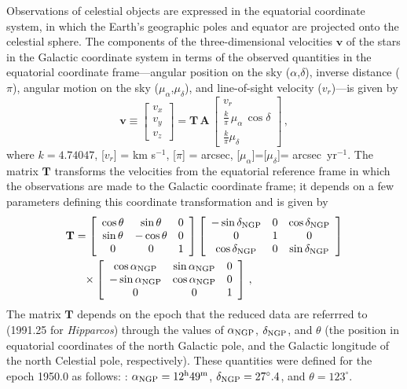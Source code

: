 \documentclass[aoas,preprint,authoryear,round]{imsart}
\newcommand{\Hipparcos}{\emph{Hipparcos}}
\renewcommand{\vec}[1]{\mathbf{#1}} %
\newcommand{\vv}{\vec{v}}
\newcommand{\ten}[1]{\mathbf{#1}} %
\newcommand{\TT}{\ten{T}}
\newcommand{\matrixleft}{\left[}
\newcommand{\matrixright}{\right]}
\newcommand{\parallax}{\ensuremath{\pi}}
\newcommand{\vrr}{\ensuremath{v_r}}
\newcommand{\ra}{\ensuremath{\alpha}}
\newcommand{\dec}{\ensuremath{\delta}}
\newcommand{\pmra}{\ensuremath{\mu_{\ra}}}
\newcommand{\pmdec}{\ensuremath{\mu_{\dec}}}
\newcommand{\vx}{\ensuremath{v_x}}
\newcommand{\vy}{\ensuremath{v_y}}
\newcommand{\vz}{\ensuremath{v_z}}
\newcommand{\AAA}{\ten{A}}
\newcommand{\arcsecs}{\textnormal{arcsec}}
\newcommand{\ngp}{\textnormal{NGP}}
\newcommand{\rangp}{\ensuremath{\ra_\ngp}}
\newcommand{\decngp}{\ensuremath{\dec_\ngp}}
\newcommand{\degree}{^{\circ}}
\begin{document}
Observations of celestial objects are expressed in the equatorial
coordinate system, in which the Earth's geographic poles and equator
are projected onto the celestial sphere. The components of the
three-dimensional velocities $\vv$ of the stars in the Galactic
coordinate system in terms of the observed quantities in the
equatorial coordinate frame---angular position on the sky (\ra,\dec),
inverse distance (\parallax), angular motion on the sky
(\pmra,\pmdec), and line-of-sight velocity (\vrr)---is given by
\begin{equation}\label{eq:vrpmrapmdectoUVW2}
\vv \equiv \matrixleft \begin{array}{c} \vx \\ \vy \\ \vz \end{array} \matrixright =
\TT \, \AAA \, \matrixleft \begin{array}{c} \vrr  \\ \frac{k}{\parallax}\,\pmra\,\cos\dec\\\frac{k}{\parallax}\pmdec\end{array} \matrixright\, ,
\end{equation}
where $k = 4.74047$, [\vrr] = km s$^{-1}$,
[\parallax] = \arcsecs, [\pmra]=[\pmdec]= \arcsecs\ yr$^{-1}$. The
matrix $\TT$ transforms the velocities from the equatorial reference
frame in which the observations are made to the Galactic coordinate
frame; it depends on a few parameters defining this coordinate
transformation and is given by
\begin{align}\label{eq:radectolbT}
\TT &= \matrixleft \begin{array}{ccc} \cos \theta & \sin \theta & 0\\\sin \theta & -\cos \theta & 0\\0&0&1 \end{array} \matrixright
\matrixleft \begin{array}{ccc} -\sin \decngp & 0 & \cos \decngp\\ 0 & 1 & 0 \\ \cos \decngp & 0 & \sin \decngp\end{array} \matrixright\\
&\phantom{=} \times \matrixleft \begin{array}{ccc} \cos \rangp &\sin\rangp&0\\ -\sin\rangp & \cos\rangp&0\\ 0&0&1\end{array} \matrixright\, ,
\end{align}
The matrix $\TT$ depends on the epoch that the reduced data are
referrred to (1991.25 for \Hipparcos) through the values of \rangp,
\decngp, and $\theta$ (the position in equatorial coordinates of the
north Galactic pole, and the Galactic longitude of the north Celestial
pole, respectively). These quantities were defined for the epoch
1950.0 as follows: \citep{1960MNRAS.121..123B}: $\rangp =
12^{\textnormal{h}}49^{\textnormal{m}}$, $\decngp = 27\degree.4$, and
$\theta = 123\degree$.
\end{document}
